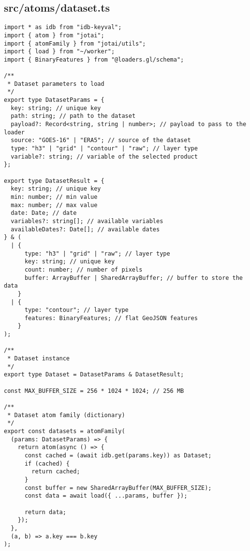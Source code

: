 \subsection{src/atoms/dataset.ts}
\begin{verbatim}
import * as idb from "idb-keyval";
import { atom } from "jotai";
import { atomFamily } from "jotai/utils";
import { load } from "~/worker";
import { BinaryFeatures } from "@loaders.gl/schema";

/**
 * Dataset parameters to load
 */
export type DatasetParams = {
  key: string; // unique key
  path: string; // path to the dataset
  payload?: Record<string, string | number>; // payload to pass to the loader
  source: "GOES-16" | "ERA5"; // source of the dataset
  type: "h3" | "grid" | "contour" | "raw"; // layer type
  variable?: string; // variable of the selected product
};

export type DatasetResult = {
  key: string; // unique key
  min: number; // min value
  max: number; // max value
  date: Date; // date
  variables?: string[]; // available variables
  availableDates?: Date[]; // available dates
} & (
  | {
      type: "h3" | "grid" | "raw"; // layer type
      key: string; // unique key
      count: number; // number of pixels
      buffer: ArrayBuffer | SharedArrayBuffer; // buffer to store the data
    }
  | {
      type: "contour"; // layer type
      features: BinaryFeatures; // flat GeoJSON features
    }
);

/**
 * Dataset instance
 */
export type Dataset = DatasetParams & DatasetResult;

const MAX_BUFFER_SIZE = 256 * 1024 * 1024; // 256 MB

/**
 * Dataset atom family (dictionary)
 */
export const datasets = atomFamily(
  (params: DatasetParams) => {
    return atom(async () => {
      const cached = (await idb.get(params.key)) as Dataset;
      if (cached) {
        return cached;
      }
      const buffer = new SharedArrayBuffer(MAX_BUFFER_SIZE);
      const data = await load({ ...params, buffer });

      return data;
    });
  },
  (a, b) => a.key === b.key
);

\end{verbatim}
